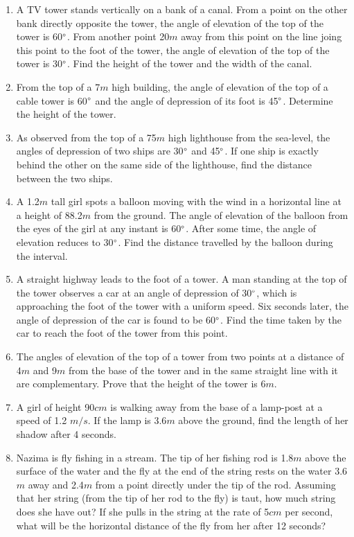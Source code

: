 \begin{enumerate}[label=\thesubsection.\arabic*.,ref=\thesubsection.\theenumi]
\item A TV tower stands vertically on a bank of a canal. From a point on the other bank directly opposite the tower, the angle of elevation of the top of the tower is 60$\degree$. From another point 20$m$ away from this point on the line joing this point to the foot of the tower, the angle of elevation of the top of the tower is 30$\degree$. Find the height of the tower and the width of the canal.
\item From the top of a 7$m$ high building, the angle of elevation of the top of a cable tower is 60$\degree$ and the angle of depression of its foot is 45$\degree$. Determine the height of the tower.
\item As observed from the top of a 75$m$ high lighthouse from the sea-level, the angles of depression of two ships are 30$\degree$ and 45$\degree$. If one ship is exactly behind the other on the same side of the lighthouse, find the distance between the two ships.
\item A 1.2$m$ tall girl spots a balloon moving with the wind in a horizontal line at a height of 88.2$m$ from the ground. The angle of elevation of the balloon from the eyes of the girl at any instant is 60$\degree$. After some time, the angle of elevation reduces to 30$\degree$. Find the distance travelled by the balloon during the interval.
\item A straight highway leads to the foot of a tower. A man standing at the top of the tower observes a car at an angle of depression of 30$\degree$, which is approaching the foot of the tower with a uniform speed. Six seconds later, the angle of depression of the car is found to be 60$\degree$. Find the time taken by the car to reach the foot of the tower from this point.
\item The angles of elevation of the top of a tower from two points at a distance of 4$m$ and 9$m$ from the base of the tower and in the same straight line with it are complementary. Prove that the height of the tower is $6m$.
\item A girl of height 90$cm$ is walking away from the base of a lamp-post at a speed of 1.2 $m/s$. If the lamp is 3.6$m$ above the ground, find the length of her shadow after 4 seconds.
\item  Nazima is fly fishing in a stream. The tip of her fishing rod is 1.8$m$ above the surface of the water and the fly at the end of the string rests on the water 3.6$m$ away and 2.4$m$ from a point directly under the tip of the rod. Assuming that her string (from the tip of her rod to the fly) is taut, how much string does she have out? If she pulls in the string at the rate of 5$cm$ per second, what will be the horizontal distance of the fly from her after 12 seconds?

\end{enumerate}
